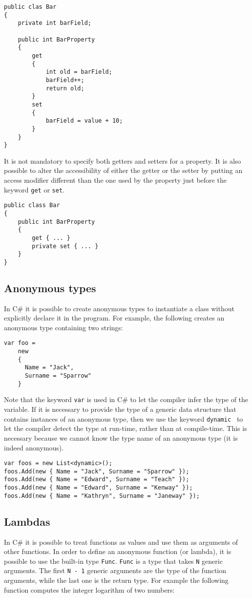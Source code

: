 \begin{lstlisting}
public clas Bar
{
	private int barField;
	
	public int BarProperty
	{
		get
		{
			int old = barField;
			barField++;
			return old;
		}
		set
		{
			barField = value + 10;
		}
	}
}
\end{lstlisting}

\noindent
It is not mandatory to specify both getters and setters for a property. It is also possible to alter the accessibility of either the getter or the setter by putting an access modifier different than the one used by the property just before the keyword \texttt{get} or \texttt{set}.

\begin{lstlisting}
public class Bar
{
	public int BarProperty
	{
		get { ... }
		private set { ... } 
	}
}
\end{lstlisting}

\subsection{Anonymous types}
In C\# it is possible to create anonymous types to instantiate a class without explicitly declare it in the program. For example, the following creates an anonymous type containing two strings:

\begin{lstlisting}
var foo =
	new
	{
	  Name = "Jack",
	  Surname = "Sparrow"
	}
\end{lstlisting}

\noindent
Note that the keyword \texttt{var} is used in C\# to let the compiler infer the type of the variable. If it is necessary to provide the type of a generic data structure that contains instances of an anonymous type, then we use the keyword \texttt{dynamic } to let the compiler detect the type at run-time, rather than at compile-time. This is necessary because we cannot know the type name of an anonymous type (it is indeed anonymous).

\begin{lstlisting}
var foos = new List<dynamic>();
foos.Add(new { Name = "Jack", Surname = "Sparrow" });
foos.Add(new { Name = "Edward", Surname = "Teach" });
foos.Add(new { Name = "Edward", Surname = "Kenway" });
foos.Add(new { Name = "Kathryn", Surname = "Janeway" });
\end{lstlisting}

\subsection{Lambdas}
In C\# it is possible to treat functions as values and use them as arguments of other functions. In order to define an anonymous function (or lambda), it is possible to use the built-in type \texttt{Func}. \texttt{Func} is a type that takes \texttt{N} generic arguments. The first \texttt{N - 1} generic arguments are the type of the function arguments, while the last one is the return type. For example the following function computes the integer logarithm of two numbers:

